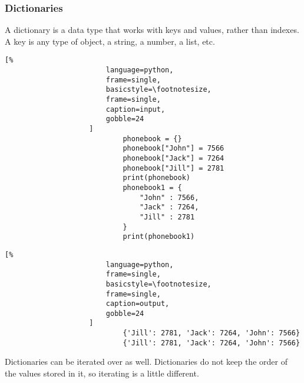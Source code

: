 \documentclass[crop=false,class=book,oneside]{standalone}
\begin{document}
            \subsubsection{Dictionaries}
                A dictionary is a data type that works with keys and
                values, rather than indexes. A key is any type of object,
                a string, a number, a list, etc.\newline
                \begin{minipage}[t]{.48\textwidth}
                    \centering
                    \begin{lstlisting}[%
                        language=python,
                        frame=single,
                        basicstyle=\footnotesize,
                        frame=single,
                        caption=input,
                        gobble=24
                    ]
                            phonebook = {}
                            phonebook["John"] = 7566
                            phonebook["Jack"] = 7264
                            phonebook["Jill"] = 2781
                            print(phonebook)
                            phonebook1 = {
                                "John" : 7566,
                                "Jack" : 7264,
                                "Jill" : 2781
                            }
                            print(phonebook1)
                    \end{lstlisting}
                \end{minipage}\hfill
                \begin{minipage}[t]{.48\textwidth}
                    \centering
                    \begin{lstlisting}[%
                        language=python,
                        frame=single,
                        basicstyle=\footnotesize,
                        frame=single,
                        caption=output,
                        gobble=24
                    ]
                            {'Jill': 2781, 'Jack': 7264, 'John': 7566}
                            {'Jill': 2781, 'Jack': 7264, 'John': 7566}
                    \end{lstlisting}
                \end{minipage}
                Dictionaries can be iterated over as well. Dictionaries
                do not keep the order of the values stored in it, so
                iterating is a little different.
                \newpage
\end{document}
